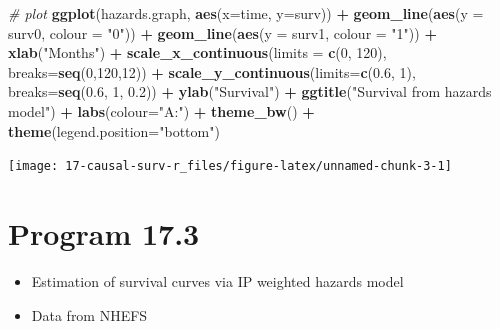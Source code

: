 \documentclass[
  10pt,
]{book}
\newenvironment{Shaded}{\begin{snugshade}}{\end{snugshade}}
\newcommand{\CommentTok}[1]{\textcolor[rgb]{0.56,0.35,0.01}{\textit{#1}}}
\newcommand{\DataTypeTok}[1]{\textcolor[rgb]{0.13,0.29,0.53}{#1}}
\newcommand{\DecValTok}[1]{\textcolor[rgb]{0.00,0.00,0.81}{#1}}
\newcommand{\FloatTok}[1]{\textcolor[rgb]{0.00,0.00,0.81}{#1}}
\newcommand{\KeywordTok}[1]{\textcolor[rgb]{0.13,0.29,0.53}{\textbf{#1}}}
\newcommand{\NormalTok}[1]{#1}
\newcommand{\OperatorTok}[1]{\textcolor[rgb]{0.81,0.36,0.00}{\textbf{#1}}}
\newcommand{\StringTok}[1]{\textcolor[rgb]{0.31,0.60,0.02}{#1}}
\providecommand{\tightlist}{%
  \setlength{\itemsep}{0pt}\setlength{\parskip}{0pt}}
\begin{document}
\begin{Shaded}
\begin{Highlighting}[]
\CommentTok{# plot}
\KeywordTok{ggplot}\NormalTok{(hazards.graph, }\KeywordTok{aes}\NormalTok{(}\DataTypeTok{x=}\NormalTok{time, }\DataTypeTok{y=}\NormalTok{surv)) }\OperatorTok{+}\StringTok{ }
\StringTok{  }\KeywordTok{geom_line}\NormalTok{(}\KeywordTok{aes}\NormalTok{(}\DataTypeTok{y =}\NormalTok{ surv0, }\DataTypeTok{colour =} \StringTok{"0"}\NormalTok{)) }\OperatorTok{+}\StringTok{ }
\StringTok{  }\KeywordTok{geom_line}\NormalTok{(}\KeywordTok{aes}\NormalTok{(}\DataTypeTok{y =}\NormalTok{ surv1, }\DataTypeTok{colour =} \StringTok{"1"}\NormalTok{)) }\OperatorTok{+}\StringTok{ }
\StringTok{  }\KeywordTok{xlab}\NormalTok{(}\StringTok{"Months"}\NormalTok{) }\OperatorTok{+}\StringTok{ }
\StringTok{  }\KeywordTok{scale_x_continuous}\NormalTok{(}\DataTypeTok{limits =} \KeywordTok{c}\NormalTok{(}\DecValTok{0}\NormalTok{, }\DecValTok{120}\NormalTok{), }\DataTypeTok{breaks=}\KeywordTok{seq}\NormalTok{(}\DecValTok{0}\NormalTok{,}\DecValTok{120}\NormalTok{,}\DecValTok{12}\NormalTok{)) }\OperatorTok{+}
\StringTok{  }\KeywordTok{scale_y_continuous}\NormalTok{(}\DataTypeTok{limits=}\KeywordTok{c}\NormalTok{(}\FloatTok{0.6}\NormalTok{, }\DecValTok{1}\NormalTok{), }\DataTypeTok{breaks=}\KeywordTok{seq}\NormalTok{(}\FloatTok{0.6}\NormalTok{, }\DecValTok{1}\NormalTok{, }\FloatTok{0.2}\NormalTok{)) }\OperatorTok{+}
\StringTok{  }\KeywordTok{ylab}\NormalTok{(}\StringTok{"Survival"}\NormalTok{) }\OperatorTok{+}\StringTok{ }
\StringTok{  }\KeywordTok{ggtitle}\NormalTok{(}\StringTok{"Survival from hazards model"}\NormalTok{) }\OperatorTok{+}\StringTok{ }
\StringTok{  }\KeywordTok{labs}\NormalTok{(}\DataTypeTok{colour=}\StringTok{"A:"}\NormalTok{) }\OperatorTok{+}
\StringTok{  }\KeywordTok{theme_bw}\NormalTok{() }\OperatorTok{+}\StringTok{ }
\StringTok{  }\KeywordTok{theme}\NormalTok{(}\DataTypeTok{legend.position=}\StringTok{"bottom"}\NormalTok{)}
\end{Highlighting}
\end{Shaded}

\begin{center}\texttt{[image: 17-causal-surv-r\_files/figure-latex/unnamed-chunk-3-1]} \end{center}

\hypertarget{program-17.3}{%
\section{Program 17.3}\label{program-17.3}}

\begin{itemize}
\tightlist
\item
  Estimation of survival curves via IP weighted hazards model
\item
  Data from NHEFS
\end{itemize}
\end{document}
